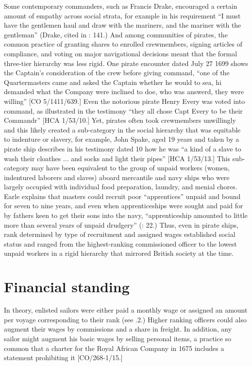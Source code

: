 Some contemporary commanders, such as Francis Drake, encouraged a certain amount of empathy across social strata, for example in his requirement “I must have the gentlemen haul and draw with the mariners, and the mariner with the gentleman” (Drake, cited in \citealt{Bicheno2012}: 141.) And among communities of pirates, the common practice of granting shares to enrolled crewmembers, signing articles of compliance, and voting on major navigational decisions meant that the formal three-tier hierarchy was less rigid. One pirate encounter dated July 27 1699 shows the Captain’s consideration of the crew before giving command, “one of the Quartermasters came and asked the Captain whether he would to sea, hi demanded what the Company were inclined to doe, who was answerd, they were willing” [CO 5/1411/639.] Even the notorious pirate Henry Every was voted into command, as illustrated in the testimony “they all chose Capt Every to be their Commandr” [HCA 1/53/10.] Yet, pirates often took crewmembers unwillingly and this likely created a sub-category in the social hierarchy that was equitable to indenture or slavery, for example, John Spake, aged 19 years and taken by a pirate ship describes in his testimony dated 10 \citealt{September1696} how he was “a kind of a slave to wash their cloathes ... and socks and light their pipes” [HCA 1/53/13.] This sub-category may have been equivalent to the group of unpaid workers (women, indentured laborers and slaves) aboard mercantile and navy ships who were largely occupied with individual food preparation, laundry, and menial chores.  Earle explains that masters could recruit poor “apprentices” unpaid and bound for seven to nine years, and even when apprenticeships were sought and paid for by fathers keen to get their sons into the navy, “apprenticeship amounted to little more than several years of unpaid drudgery” (\citealt{Earle1998}: 22.) Thus, even in pirate ships, rank determined by type of recruitment and assigned wages established social status and ranged from the highest-ranking commissioned officer to the lowest unpaid workers in a rigid hierarchy that mirrored British society at the time. 

\section{{Financial} {standing}}%

In theory, enlisted sailors were either paid a monthly wage or assigned an amount per voyage corresponding to their rank (see .2.) Higher ranking officers could also augment their wages by commissions and a share in freight. In addition, any sailor might augment his basic wages by selling personal items, a practice so common that a charter for the Royal African Company in 1675 includes a statement prohibiting it [CO/268-1/15.]  

